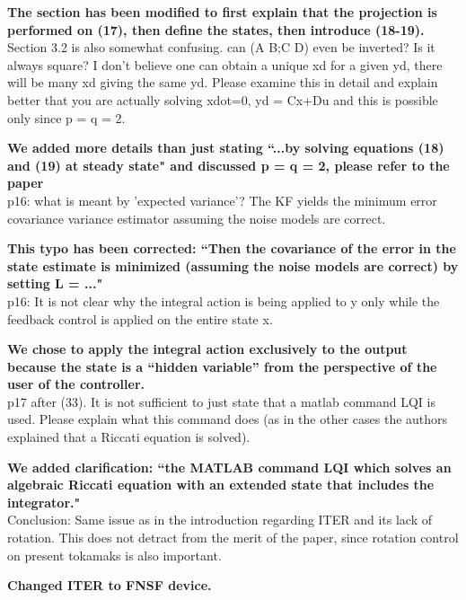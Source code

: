 \documentclass{scrartcl}
\newcommand{\response}[1]{\textcolor{red!80!black}{\bf #1}}
\begin{document}
\response{The section has been modified to first explain that the projection is performed on (17), then define the states, then introduce (18-19).}\\

Section 3.2 is also somewhat confusing. can (A B;C D) even be inverted? Is it always square? I don't believe one can obtain a unique xd for a given yd, there will be many xd giving the same yd. Please examine this in detail and explain better that you are actually solving xdot=0, yd = Cx+Du and this is possible only since p = q = 2.\

\response{We added more details than just stating ``...by solving equations (18) and (19) at steady state" and discussed p = q = 2, please refer to the paper}\\

p16: what is meant by 'expected variance'? The KF yields the minimum error covariance variance estimator assuming the noise models are correct.

\response{This typo has been corrected: ``Then the covariance of the error in the state estimate is minimized (assuming the noise models are correct) by setting
L = ..."}\\

p16: It is not clear why the integral action is being applied to y only while the feedback control is applied on the entire state x.

\response{We chose to apply the integral action exclusively to the output  because the state is a ``hidden variable'' from the perspective of the user of the controller.}\\

p17 after (33). It is not sufficient to just state that a matlab command LQI is used. Please explain what this command does (as in the other cases the authors explained that a Riccati equation is solved).

\response{We added clarification: ``the MATLAB command LQI which solves an algebraic Riccati equation with an extended state that includes the integrator."} \\

Conclusion: Same issue as in the introduction regarding ITER and its lack of rotation. This does not detract from the merit of the paper, since rotation control on present tokamaks is also important.

\response{Changed ITER to FNSF device.} \\
\end{document}
